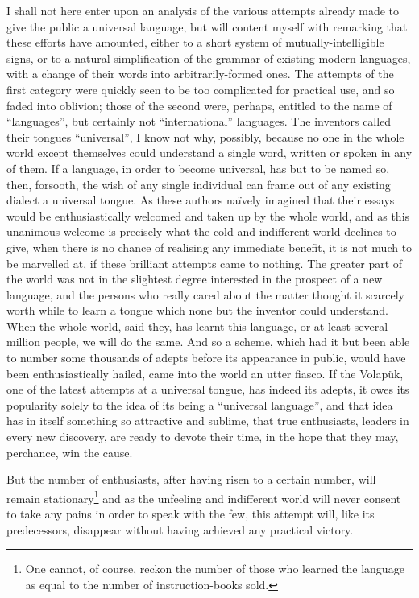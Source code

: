 \documentclass[12pt,twoside]{book}
\begin{document}
I shall not here enter upon an analysis of the various attempts already made to give the public a universal language, but will content myself with remarking that these efforts have amounted, either to a short system of mutually-intelligible signs, or to a natural simplification of the grammar of existing modern languages, with a change of their words into arbitrarily-formed ones. The attempts of the first category were quickly seen to be too complicated for practical use, and so faded into oblivion; those of the second were, perhaps, entitled to the name of “languages”, but certainly not “international” languages. The inventors called their tongues “universal”, I know not why, possibly, because no one in the whole world except themselves could understand a single word, written or spoken in any of them. If a language, in order to become universal, has but to be named so, then, forsooth, the wish of any single individual can frame out of any existing dialect a universal tongue. As these authors na\"{i}vely imagined that their essays would be enthusiastically welcomed and taken up by the whole world, and as this unanimous welcome is precisely what the cold and indifferent world declines to give, when there is no chance of realising any immediate benefit, it is not much to be marvelled at, if these brilliant attempts came to nothing. The greater part of the world was not in the slightest degree interested in the prospect of a new language, and the persons who really cared about the matter thought it scarcely worth while to learn a tongue which none but the inventor could understand. When the whole world, said they, has learnt this language, or at least several million people, we will do the same. And so a scheme, which had it but been able to number some thousands of adepts before its appearance in public, would have been enthusiastically hailed, came into the world an utter fiasco. If the \glqq{}Volapük\grqq{}, one of the latest attempts at a universal tongue, has indeed its adepts, it owes its popularity solely to the idea of its being a “universal language”, and that idea has in itself something so attractive and sublime, that true enthusiasts, leaders in every new discovery, are ready to devote their time, in the hope that they may, perchance, win the cause.

But the number of enthusiasts, after having risen to a certain number, will remain stationary\footnote{One cannot, of course, reckon the number of those who learned the language as equal to the number of instruction-books sold.} and as the unfeeling and indifferent world will never consent to take any pains in order to speak with the few, this attempt will, like its predecessors, disappear without having achieved any practical victory.
\end{document}
